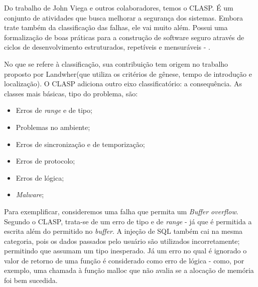 			

			Do trabalho de John Viega e outros colaboradores, temos o CLASP. É um conjunto
			de atividades que busca melhorar a segurança dos sistemas. Embora
			trate também da classificação das falhas, ele vai muito além. Possui uma formalização
			de boas práticas para a construção de software seguro através de ciclos de desenvolvimento
			estruturados, repetíveis e mensuráveis - \cite{Secure2006}.
			

			No que se refere à classificação, sua contribuição tem origem no trabalho proposto por 
			Landwher(que utiliza os critérios de gênese, tempo de introdução e localização).
			O CLASP adiciona outro eixo classificatório: a consequência.
			As classes mais básicas, tipo do problema, são:
			\begin{itemize}
				\item{Erros de \textsl{range} e de tipo;}
				\item{Problemas no ambiente;}
				\item{Erros de sincronização e de temporização;}
				\item{Erros de protocolo;}
				\item{Erros de lógica;}
				\item{\textsl{Malware};}
			\end{itemize}
			Para exemplificar, consideremos uma falha que permita um \textsl{Buffer overflow}.
			Segundo o CLASP, trata-se de um erro de tipo e de \textsl{range} - já
			que é permitida a escrita além do permitido no \textsl{buffer}. A injeção de SQL
			também cai na mesma categoria, pois os dados passados pelo usuário são utilizados
			incorretamente; permitindo que assumam um tipo inesperado. Já um erro no qual é ignorado
			o valor de retorno de uma função é considerado como erro de lógica - como, por exemplo,
			uma chamada à função malloc que não avalia se a alocação de memória foi bem sucedida.


